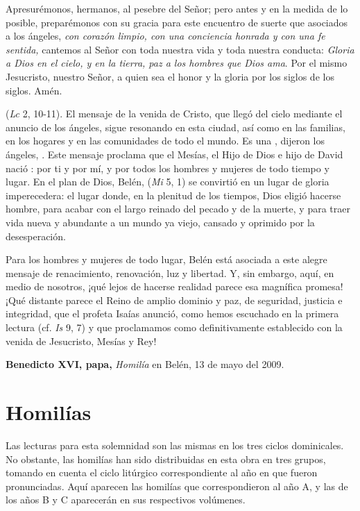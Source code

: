 Apresurémonos, hermanos, al pesebre del Señor; pero antes y en la medida de lo posible, preparémonos con su gracia para este encuentro de suerte que asociados a los ángeles, \emph{con corazón limpio, con una conciencia honrada y con una fe sentida,} cantemos al Señor con toda nuestra vida y toda nuestra conducta: \emph{Gloria a Dios en el cielo, y en la tierra, paz a los hombres que Dios ama}. Por el mismo Jesucristo, nuestro Señor, a quien sea el honor y la gloria por los siglos de los siglos. Amén.

 (\emph{Lc} 2, 10-11). El mensaje de la venida de Cristo, que llegó del cielo mediante el anuncio de los ángeles, sigue resonando en esta ciudad, así como en las familias, en los hogares y en las comunidades de todo el mundo. Es una , dijeron los ángeles, . Este mensaje proclama que el Mesías, el Hijo de Dios e hijo de David nació : por ti y por mí, y por todos los hombres y mujeres de todo tiempo y lugar. En el plan de Dios, Belén,  (\emph{Mi} 5, 1) se convirtió en un lugar de gloria imperecedera: el lugar donde, en la plenitud de los tiempos, Dios eligió hacerse hombre, para acabar con el largo reinado del pecado y de la muerte, y para traer vida nueva y abundante a un mundo ya viejo, cansado y oprimido por la desesperación.

Para los hombres y mujeres de todo lugar, Belén está asociada a este alegre mensaje de renacimiento, renovación, luz y libertad. Y, sin embargo, aquí, en medio de nosotros, ¡qué lejos de hacerse realidad parece esa magnífica promesa! ¡Qué distante parece el Reino de amplio dominio y paz, de seguridad, justicia e integridad, que el profeta Isaías anunció, como hemos escuchado en la primera lectura (cf. \emph{Is} 9, 7) y que proclamamos como definitivamente establecido con la venida de Jesucristo, Mesías y Rey!

\textbf{Benedicto XVI, papa,} \emph{Homilía} en Belén, 13 de mayo del 2009.


\section{Homilías}

Las lecturas para esta solemnidad son las mismas en los tres ciclos dominicales. No obstante, las homilías han sido distribuidas en esta obra en tres grupos, tomando en cuenta el ciclo litúrgico correspondiente al año en que fueron pronunciadas. Aquí aparecen las homilías que correspondieron al año A, y las de los años B y C aparecerán en sus respectivos volúmenes.


